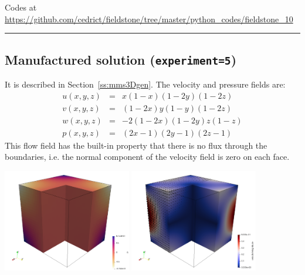 

\begin{center}
Codes at \url{https://github.com/cedrict/fieldstone/tree/master/python_codes/fieldstone_10}
\end{center}

\par\noindent\rule{\textwidth}{0.4pt}


\subsection*{Manufactured solution ({\tt experiment=5})}

It is described in Section~\ref{ss:mms3Dgen}.
The velocity and pressure fields are:
\begin{eqnarray}
u(x,y,z) &=& x(1-x)(1-2y)(1-2z)\\
v(x,y,z) &=& (1-2x) y(1-y) (1-2z) \\
w(x,y,z) &=& -2(1-2x)(1-2y)z(1-z) \\
p(x,y,z) &=& (2x-1)(2y-1)(2z-1)
\end{eqnarray}
This flow field has the built-in property that there is no flux through the 
boundaries, i.e. the normal component of the velocity field is zero on each face. 

\begin{center}
\includegraphics[width=5.6cm]{python_codes/fieldstone_10/results/exp5/press}
\includegraphics[width=5.6cm]{python_codes/fieldstone_10/results/exp5/vel}
\end{center}

